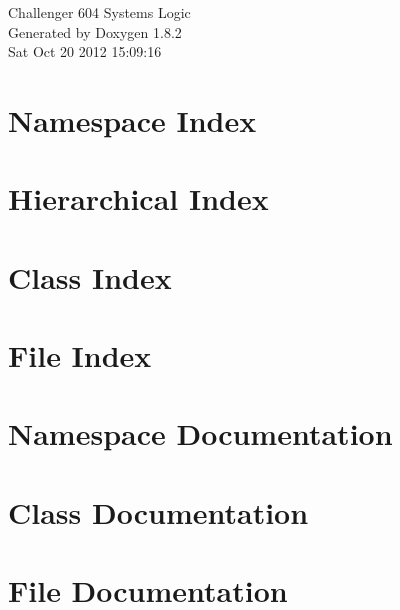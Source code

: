 \documentclass{book}
\begin{document}
\hypersetup{pageanchor=false,citecolor=blue}
\begin{titlepage}
\vspace*{7cm}
\begin{center}
{\Large Challenger 604 Systems Logic }\\
\vspace*{1cm}
{\large Generated by Doxygen 1.8.2}\\
\vspace*{0.5cm}
{\small Sat Oct 20 2012 15:09:16}\\
\end{center}
\end{titlepage}
\clearemptydoublepage
{}
\tableofcontents
\clearemptydoublepage
{}
\hypersetup{pageanchor=true,citecolor=blue}
\chapter{Namespace Index}

\chapter{Hierarchical Index}

\chapter{Class Index}

\chapter{File Index}

\chapter{Namespace Documentation}



\chapter{Class Documentation}




















\chapter{File Documentation}

\printindex
\end{document}
